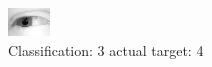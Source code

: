 \begin{figure}[h!]
\begin{center}
\includegraphics[width=0.60\columnwidth]{figures/ID2406_class_3_target_4.png}
\end{center}
\caption{ Classification: 3 actual target: 4}
\label{fig:ID2406_class_3_target_4}
\end{figure}
